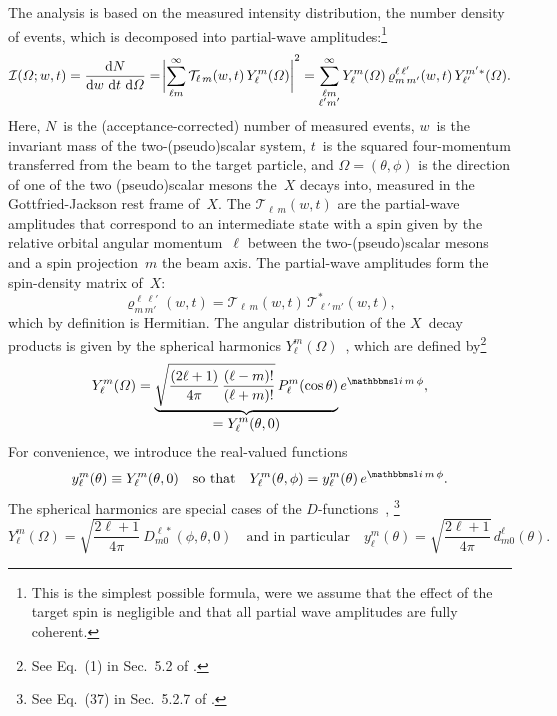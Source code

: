 The analysis is based on the measured intensity distribution, \ie the
number density of events, which is decomposed into partial-wave
amplitudes:\footnote{This is the simplest possible formula, were we
assume that the effect of the target spin is negligible and that all
partial wave amplitudes are fully coherent.}
\begin{equation}
  \label{eq:diffraction_intensity}
  \mathcal{I}(\Omega; w, t)
  = \frac{\dif{N}}{\dif{w}\, \dif{t}\, \dif{\Omega}}
  = \Abs[3]{\sum_{\ell m}^\infty \mathcal{T}_{\ell\, m}(w, t)\, Y_\ell^m(\Omega)}^2
  = \sum_{\substack{\ell m \\ \ell' m'}}^\infty Y_\ell^m(\Omega)\, \varrho^{\ell\, \ell'}_{m\, m'}(w, t)\, Y_{\ell'}^{m' *}(\Omega).
\end{equation}
Here, $N$~is the (acceptance-corrected) number of measured events,
$w$~is the invariant mass of the two-(pseudo)scalar system, $t$~is the
squared four-momentum transferred from the beam to the target
particle, and $\Omega = (\theta, \phi)$ is the direction of one of the
two (pseudo)scalar mesons the~$X$ decays into, measured in the
Gottfried-Jackson rest frame of~$X$.  The $\mathcal{T}_{\ell\, m}(w,
t)$ are the partial-wave amplitudes that correspond to an intermediate
state with a spin given by the relative orbital angular
momentum~$\ell$ between the two-(pseudo)scalar mesons and a spin
projection~$m$ \wrt the beam axis.  The partial-wave amplitudes form
the spin-density matrix of~$X$:
\begin{equation}
  \label{eq:diffraction_spin_dens_def}
  \varrho^{\ell\, \ell'}_{m\, m'}(w, t)
  = \mathcal{T}_{\ell\, m}(w, t)\, \mathcal{T}_{\ell'\, m'}^*(w, t),
\end{equation}
which by definition is Hermitian.  The angular distribution of the
$X$~decay products is given by the spherical harmonics
$Y_\ell^m(\Omega)$~\cite{wikipedia:sphericalHarm}, which are defined
by\footnote{See Eq.~(1) in Sec.~5.2 of
.}
\begin{equation}
  \label{eq:spherical_harm_def}
  Y_\ell^m(\Omega)
  = \dUnderbrace{\sqrt{\frac{(2 \ell + 1)}{4 \pi}\, \frac{(\ell -m)!}{(\ell + m)!}}\, P_\ell^m(\cos\theta)}{= Y_\ell^m(\theta, 0)}\, e^{\imag\, m\, \phi},
\end{equation}
For convenience, we introduce the real-valued functions
\begin{equation}
  \label{eq:small_y_def}
  y_\ell^m(\theta)
  \equiv Y_\ell^m(\theta, 0)
  \quad\text{so that}\quad
  Y_\ell^m(\theta, \phi)
  = y_\ell^m(\theta)\, e^{\imag\, m\, \phi}.
\end{equation}
The spherical harmonics are special cases of the
$D$-functions~\cite{wikipedia:wignerD}, \ie\footnote{See Eq.~(37) in
Sec.~5.2.7 of .}
\begin{equation}
  \label{eq:spherical_harm_wigner_d}
  Y_\ell^m(\Omega)
  = \sqrt{\frac{2 \ell + 1}{4 \pi}}\, D^{\ell *}_{m 0}(\phi, \theta, 0)
  \quad\text{and in particular}\quad
  y_\ell^m(\theta)
  = \sqrt{\frac{2 \ell + 1}{4 \pi}}\, d^\ell_{m 0}(\theta).
\end{equation}

